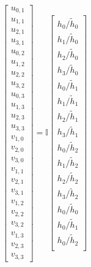 \documentclass[a4paper,10pt]{scrreprt}
\begin{document}
\begin{equation}
    \begin{bmatrix}
        u_{0,1} \\
        u_{1,1} \\
        u_{2,1} \\
        u_{3,1} \\
        u_{0,2} \\
        u_{1,2} \\
        u_{2,2} \\
        u_{3,2} \\
        u_{0,3} \\
        u_{1,3} \\
        u_{2,3} \\
        u_{3,3} \\
        v_{1,0} \\
        v_{2,0} \\
        v_{3,0} \\
        v_{1,1} \\
        v_{2,1} \\
        v_{3,1} \\
        v_{1,2} \\
        v_{2,2} \\
        v_{3,2} \\
        v_{1,3} \\
        v_{2,3} \\
        v_{3,3}
    \end{bmatrix}
    =
    \mathbb{I}
    \begin{bmatrix}
        h_0 / \tilde{h}_0 \\
        h_1 / \tilde{h}_0 \\
        h_2 / \tilde{h}_0 \\
        h_3 / \tilde{h}_0 \\
        h_0 / \tilde{h}_1 \\
        h_1 / \tilde{h}_1 \\
        h_2 / \tilde{h}_1 \\
        h_3 / \tilde{h}_1 \\
        h_0 / \tilde{h}_2 \\
        h_1 / \tilde{h}_2 \\
        h_2 / \tilde{h}_2 \\
        h_3 / \tilde{h}_2 \\
        h_0 / \tilde{h}_0 \\
        h_0 / \tilde{h}_1 \\
        h_0 / \tilde{h}_2 \\

\end{bmatrix}
\end{equation}
\end{document}
